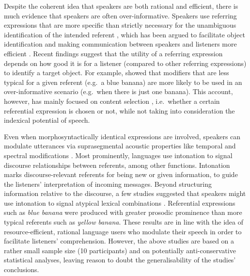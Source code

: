 \documentclass[Review,times,sageh]{sagej}
\begin{document}
Despite the coherent idea that speakers are both rational and efficient, there is much evidence that speakers are often over-informative.
Speakers use referring expressions that are more specific than strictly necessary for the unambiguous identification of the intended referent \citep{sedivy2003pragmatic, westerbeek2015stored, rubio2016redundant}, which has been argued to facilitate object identification and making communication between speakers and listeners more efficient \citep{arts2011overspecification, paraboni2007generating, rubio2016redundant}.
Recent findings suggest that the utility of a referring expression depends on how good it is for a listener (compared to other referring expressions) to identify a target object.
For example, \citet{degen2020redundancy} showed that modifiers that are less typical for a given referent (e.g.~a blue banana) are more likely to be used in an over-informative scenario (e.g.~when there is just one banana).
This account, however, has mainly focused on content selection \citep{gatt2013we}, i.e.~whether a certain referential expression is chosen or not, while not taking into consideration the indexical potential of speech.

Even when morphosyntactically identical expressions are involved, speakers can modulate utterances via suprasegmental acoustic properties like temporal and spectral modifications \citep[e.g.,][]{ladd2008intonational}.
Most prominently, languages use intonation to signal discourse relationships between referents, among other functions.
Intonation marks discourse-relevant referents for being new or given information, to guide the listeners' interpretation of incoming messages.
Beyond structuring information relative to the discourse, a few studies suggested that speakers might use intonation to signal atypical lexical combinations \citep[e.g.][]{dimitrova2008prosodic, dimitrova2009did}.
Referential expressions such as \emph{blue banana} were produced with greater prosodic prominence than more typical referents such as \emph{yellow banana}.
These results are in line with the idea of resource-efficient, rational language users who modulate their speech in order to facilitate listeners' comprehension.
However, the above studies are based on a rather small sample size (10 participants) and on potentially anti-conservative statistical analyses, leaving reason to doubt the generalisability of the studies' conclusions.
\end{document}
